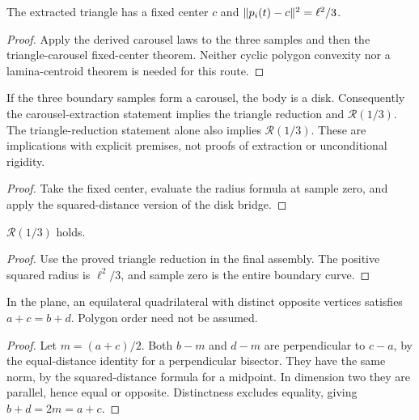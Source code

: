 \begin{proposition}
\label{prop:triangle}
\leanok
{}
The extracted triangle has a fixed center $c$ and
$\lVert p_i(t)-c\rVert^2=\ell^2/3$.
\end{proposition}
\begin{proof}
\leanok
Apply the derived carousel laws to the three samples and then the
triangle-carousel fixed-center theorem. Neither cyclic polygon convexity
nor a lamina-centroid theorem is needed for this route.
\end{proof}

\begin{lemma}
\label{lem:third-assembly}
\leanok
{}
If the three boundary samples form a carousel, the body is a disk.
Consequently the carousel-extraction statement implies the triangle
reduction and $\mathcal R(1/3)$. The triangle-reduction statement alone
also implies $\mathcal R(1/3)$. These are implications with explicit
premises, not proofs of extraction or unconditional rigidity.
\end{lemma}
\begin{proof}
\leanok
Take the fixed center, evaluate the radius formula at sample zero,
and apply the squared-distance version of the disk bridge.
\end{proof}

\begin{theorem}
\label{thm:third}
\leanok
{}
$\mathcal R(1/3)$ holds.
\end{theorem}
\begin{proof}
\leanok
Use the proved triangle reduction in the final assembly. The positive
squared radius is $\ell^2/3$, and sample zero is the entire boundary curve.
\end{proof}

\begin{lemma}
\label{lem:quadrilateral-geometry}
\leanok
{}
In the plane, an equilateral quadrilateral with distinct opposite
vertices satisfies $a+c=b+d$. Polygon order need not be assumed.
\end{lemma}
\begin{proof}
\leanok
Let $m=(a+c)/2$. Both $b-m$ and $d-m$ are perpendicular to $c-a$,
by the equal-distance identity for a perpendicular bisector. They have
the same norm, by the squared-distance formula for a midpoint.
In dimension two they are parallel, hence equal or opposite. Distinctness
excludes equality, giving $b+d=2m=a+c$.
\end{proof}


